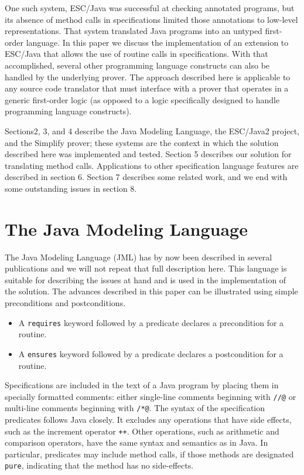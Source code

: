 \documentclass{sig-alternate}
\begin{document}
One such system,
ESC/Java \cite{ESCJava} was successful at checking annotated programs, but its
absence of method calls in specifications limited those annotations to
low-level representations.  That system translated Java programs into
an untyped first-order language.  In this paper we discuss the implementation
of an extension to ESC/Java that allows the use of routine calls in
specifications.  With that accomplished, several other programming
language constructs can also be handled by the underlying prover.
The approach described here is applicable to any source code translator
that must interface with a prover that operates in a generic first-order 
logic (as opposed to a logic specifically designed to handle programming language
constructs).

Sections2, 3, and 4 describe the Java Modeling
Language, the ESC/Java2 project, and the Simplify prover; these systems
are the context in which the solution described here was implemented 
and tested.  Section 5 describes our solution for translating method calls.
Applications to other specification language features are described in section 6.
Section 7 describes some related work,
and we end with some outstanding issues in section 8.


\section{The Java Modeling Language}

The Java Modeling Language (JML) has by now been described in several publications
\cite{jmlpapers,Leavens-Baker-Ruby99b,Leavens-Baker-Ruby02} and we will not repeat that full description here.  This language is suitable for
describing the issues at hand and is used in the implementation of the solution.
 The advances described in this paper
can be illustrated using simple preconditions and postconditions.  
\begin{itemize}
\setlength{\itemsep}{0in}
\setlength{\parsep}{0in}
\item A \texttt{requires} keyword followed by a predicate declares a precondition for a routine.
\item A \texttt{ensures} keyword followed by a predicate declares a postcondition for a routine.
\end{itemize}
Specifications are included in the text of a Java program by placing them in 
specially formatted comments: either single-line comments
beginning with  \texttt{//@} or multi-line comments beginning with  \texttt{/*@}.
The syntax of the specification predicates follows Java closely.  It excludes any operations 
that have side effects, such as the increment operator
 \texttt{++}.  Other operations, such as arithmetic and 
comparison operators, have the same syntax and semantics as in Java.  In particular, 
predicates may include method calls, if those methods are designated \texttt{pure},
indicating that the method has no side-effects. 
\end{document}
